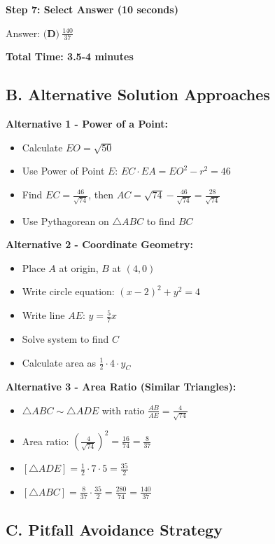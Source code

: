 \documentclass[]{article}
\begin{document}
\begin{solutionbox}
\textbf{Step 7: Select Answer (10 seconds)}

Answer: $\boxed{\textbf{(D)}\ \frac{140}{37}}$

\textbf{Total Time: 3.5-4 minutes}

\subsection*{B. Alternative Solution Approaches}

\textbf{Alternative 1 - Power of a Point:}
\begin{itemize}[leftmargin=*]
    \item Calculate $EO = \sqrt{50}$
    \item Use Power of Point $E$: $EC \cdot EA = EO^2 - r^2 = 46$
    \item Find $EC = \frac{46}{\sqrt{74}}$, then $AC = \sqrt{74} - \frac{46}{\sqrt{74}} = \frac{28}{\sqrt{74}}$
    \item Use Pythagorean on $\triangle ABC$ to find $BC$
\end{itemize}

\textbf{Alternative 2 - Coordinate Geometry:}
\begin{itemize}[leftmargin=*]
    \item Place $A$ at origin, $B$ at $(4,0)$
    \item Write circle equation: $(x-2)^2 + y^2 = 4$
    \item Write line $AE$: $y = \frac{5}{7}x$
    \item Solve system to find $C$
    \item Calculate area as $\frac{1}{2} \cdot 4 \cdot y_C$
\end{itemize}

\textbf{Alternative 3 - Area Ratio (Similar Triangles):}
\begin{itemize}[leftmargin=*]
    \item $\triangle ABC \sim \triangle ADE$ with ratio $\frac{AB}{AE} = \frac{4}{\sqrt{74}}$
    \item Area ratio: $\left(\frac{4}{\sqrt{74}}\right)^2 = \frac{16}{74} = \frac{8}{37}$
    \item $[\triangle ADE] = \frac{1}{2} \cdot 7 \cdot 5 = \frac{35}{2}$
    \item $[\triangle ABC] = \frac{8}{37} \cdot \frac{35}{2} = \frac{280}{74} = \frac{140}{37}$
\end{itemize}

\subsection*{C. Pitfall Avoidance Strategy}


\end{solutionbox}
\end{document}
